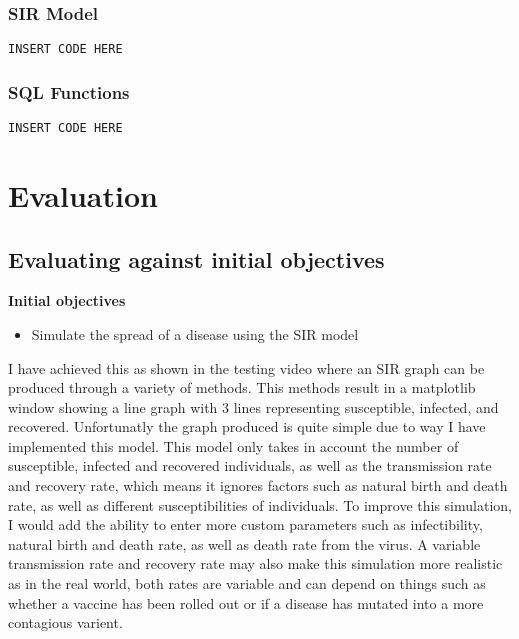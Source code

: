\documentclass[11pt, a4paper]{article}
\begin{document}
\subsubsection{SIR Model}
\begin{lstlisting}
INSERT CODE HERE
\end{lstlisting}

\subsubsection{SQL Functions}
\begin{lstlisting}
INSERT CODE HERE
\end{lstlisting}


\newpage
\section{Evaluation}
\subsection{Evaluating against initial objectives}
\textbf{Initial objectives}
\begin{itemize}
    \item Simulate the spread of a disease using the SIR model
\end{itemize}
I have achieved this as shown in the testing video where an SIR graph can be produced through a variety of methods. This methods result in a matplotlib window showing a line graph with 3 lines representing susceptible, infected, and recovered. Unfortunatly the graph produced is quite simple due to way I have implemented this model. This model only takes in account the number of susceptible, infected and recovered individuals, as well as the transmission rate and recovery rate, which means it ignores factors such as natural birth and death rate, as well as different susceptibilities of individuals. To improve this simulation, I would add the ability to enter more custom parameters such as infectibility, natural birth and death rate, as well as death rate from the virus. A variable transmission rate and recovery rate may also make this simulation more realistic as in the real world, both rates are variable and can depend on things such as  whether a vaccine has been rolled out or if a disease has mutated into a more contagious varient.
\end{document}
